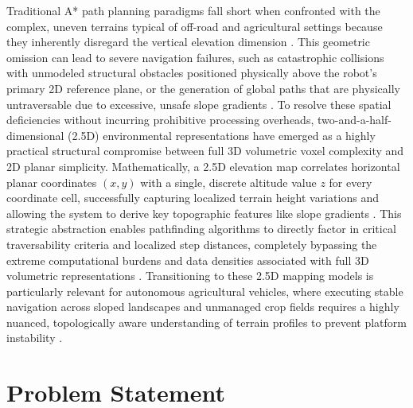 Traditional A* path planning paradigms fall short when confronted with the
complex, uneven terrains typical of off-road and agricultural settings because
they inherently disregard the vertical elevation dimension
\citep{Bettencourt_2025_indoor25d}. This geometric omission can lead to severe
navigation failures, such as catastrophic collisions with unmodeled structural
obstacles positioned physically above the robot's primary 2D reference plane, or
the generation of global paths that are physically untraversable due to
excessive, unsafe slope gradients \citep{Bettencourt_2025_indoor25d}. To resolve
these spatial deficiencies without incurring prohibitive processing overheads,
two-and-a-half-dimensional (2.5D) environmental representations have emerged as
a highly practical structural compromise between full 3D volumetric voxel
complexity and 2D planar simplicity. Mathematically, a 2.5D elevation map
correlates horizontal planar coordinates $(x, y)$ with a single, discrete
altitude value $z$ for every coordinate cell, successfully capturing localized
terrain height variations and allowing the system to derive key topographic
features like slope gradients \citep{Bettencourt_2025_indoor25d}. This strategic
abstraction enables pathfinding algorithms to directly factor in critical
traversability criteria and localized step distances, completely bypassing the
extreme computational burdens and data densities associated with full 3D
volumetric representations \citep{Bettencourt_2025_indoor25d}. Transitioning to
these 2.5D mapping models is particularly relevant for autonomous agricultural
vehicles, where executing stable navigation across sloped landscapes and
unmanaged crop fields requires a highly nuanced, topologically aware
understanding of terrain profiles to prevent platform instability
\citep{Hameed_2021_comprehensivereview}.

\section{Problem Statement}

